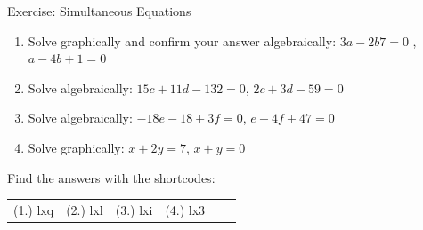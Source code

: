     \noindent
\par
    \noindent
\label{m39257*secfhsst!!!underscore!!!id5809}
 { Exercise: Simultaneous Equations }
            \nopagebreak
        \label{m39257*id161286}\begin{enumerate}[noitemsep, label=\textbf{\arabic*}. ] 
            \label{m39257*uid98}\item Solve graphically and confirm your answer algebraically:
$3a-2b7=0$ , $a-4b+1=0$\hspace{1ex}        
\label{m39257*uid99}\item Solve algebraically: $15c+11d-132=0$, $2c+3d-59=0$\hspace{1ex}        
\label{m39257*uid100}\item Solve algebraically: $-18e-18+3f=0$, $e-4f+47=0$\hspace{1ex}        
\label{m39257*uid101}\item Solve graphically: $x+2y=7$, $x+y=0$\hspace{1ex}        
\end{enumerate}
\label{m39257**end}
\par {} Find the answers with the shortcodes:
 \par \begin{tabular}[h]{cccccc}
 (1.) lxq  &  (2.) lxl  &  (3.) lxi  &  (4.) lx3  & \end{tabular}
